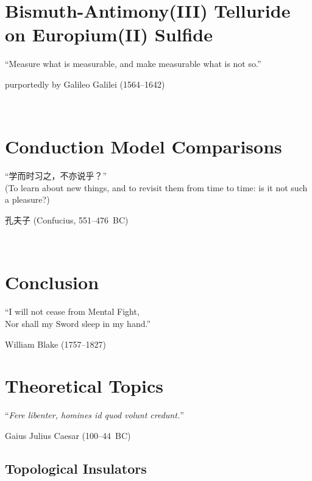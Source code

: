 ﻿\documentclass{report}
\begin{document}
\chapter{Bismuth-Antimony(III) Telluride on Europium(II) Sulfide}\label{ch:bilayer2018}
\epigraph{``Measure what is measurable, and make measurable what is not so.''}{purportedly by Galileo Galilei (1564--1642)}~\\
    

\chapter{Conduction Model Comparisons}\label{ch:models}
    \begin{CJK*}{UTF8}{gkai}
    \epigraph{``学而时习之，不亦说乎？''\\(To learn about new things, and to revisit them from time to time: is it not such a pleasure?)}{孔夫子 (Confucius, 551--476~BC)}~\\
    \end{CJK*}
    

\chapter{Conclusion}\label{ch:conclusion}
\epigraph{``I will not cease from Mental Fight,\\Nor shall my Sword sleep in my hand.''}{William Blake (1757--1827)}
    
\appendix
%
%
\chapter{Theoretical Topics}\label{ch:theory}
\epigraph{``\textit{Fere libenter, homines id quod volunt credunt.}''}{Gaius Julius Caesar (100--44~BC)}
    \section{Topological Insulators}\label{sec:ti}
        
\end{document}
